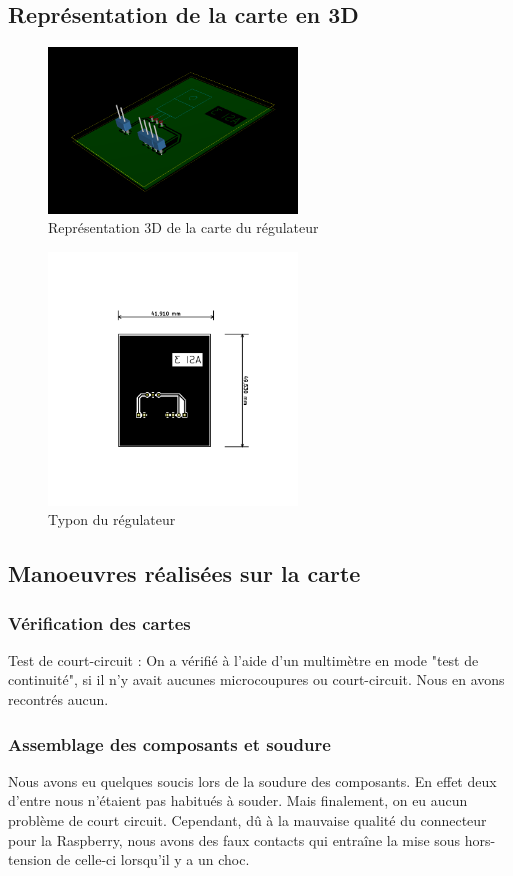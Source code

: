 \subsection{Représentation de la carte en 3D}
\begin{figure}[H]
	\centering
	\includegraphics[width=250px]{images/3DReg.png}
	\caption{Représentation 3D de la carte du régulateur}
\end{figure}
\begin{figure}[H]
	\centering
	\includegraphics[width=250px]{images/typonReg.png}
	\caption{Typon du régulateur}
\end{figure}

\subsection{Manoeuvres réalisées sur la carte}
	\subsubsection{Vérification des cartes}
		Test de court-circuit : On a vérifié à l'aide d'un multimètre en mode "test de continuité", si il n'y avait aucunes microcoupures ou court-circuit. Nous en avons recontrés aucun.
	\subsubsection{Assemblage des composants et soudure}
	Nous avons eu quelques soucis lors de la soudure des composants. En effet deux d'entre nous n'étaient pas habitués à souder. Mais finalement, on eu aucun problème de court circuit. Cependant, dû à la mauvaise qualité du connecteur pour la Raspberry, nous avons des faux contacts qui entraîne la mise sous hors-tension de celle-ci lorsqu'il y a un choc.

